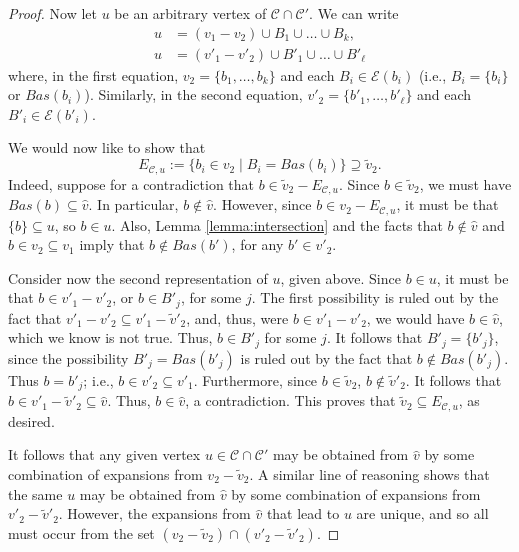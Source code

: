 \documentclass{amsart}
\newtheorem{standing assumption}[theorem]{Standing Assumption}
\begin{document}
\begin{proof}
Now let $u$ be an arbitrary vertex of $\mathcal{C} \cap \mathcal{C}'$. We 
can write
\begin{align*}
u &= (v_{1} - v_{2}) \cup B_{1} \cup \ldots \cup B_{k}, \\
u &= (v'_{1} - v'_{2}) \cup B'_{1} \cup \ldots \cup B'_{\ell}
\end{align*}
where, in the first equation,
 $v_{2} = \{ b_{1}, \ldots, b_{k} \}$ and 
each $B_{i} \in \mathcal{E}(b_{i})$ (i.e., $B_{i} = \{ b_{i} \}$
or $Bas(b_{i})$).
Similarly, in the second equation, 
$v'_{2} = \{ b'_{1}, \ldots, b'_{\ell} \}$ and 
each $B'_{i} \in \mathcal{E}(b'_{i})$.

We would now like to show that 
\[ E_{\mathcal{C},u} := \{ b_{i} \in v_{2} \mid B_{i} = Bas(b_{i}) \} \supseteq \tilde{v}_{2}. \]
Indeed, suppose for a contradiction that $b \in \tilde{v}_{2} - E_{\mathcal{C},u}$. Since $b \in \tilde{v}_{2}$, we must have $Bas(b) \subseteq \hat{v}$. In particular, $b \not \in \hat{v}$. However, since $b \in v_{2} - E_{\mathcal{C},u}$,
it must be that $\{ b \} \subseteq u$, so $b \in u$. Also, Lemma \ref{lemma:intersection} and the facts that $b \not \in \hat{v}$ and $b \in v_{2} \subseteq v_{1}$ imply that $b \not \in Bas(b')$, for any $b' \in v'_{2}$. 

Consider now the second representation of $u$, given above. Since $b \in u$, it must be that $b \in v'_{1} - v'_{2}$, or 
$b \in B'_{j}$, for some $j$. The first possibility is ruled out by the fact that $v'_{1} - v'_{2} \subseteq v'_{1} - \tilde{v}'_{2}$, and, thus, were $b \in v'_{1} - v'_{2}$, we would have $b \in \hat{v}$, which we know is not true. Thus, $b \in B'_{j}$ for some $j$. It follows that $B'_{j} = \{ b'_{j} \}$, since the possibility $B'_{j} = Bas(b'_{j})$ is ruled out by the fact that $b \not \in Bas(b'_{j})$. Thus $b = b'_{j}$; i.e., $b \in v'_{2} \subseteq v'_{1}$. Furthermore, since $b \in \tilde{v}_{2}$, 
$b \not \in \tilde{v}'_{2}$. It follows that $b \in v'_{1} - \tilde{v}'_{2} \subseteq \hat{v}$. Thus, $b \in \hat{v}$, a contradiction. This proves that $\tilde{v}_{2} \subseteq E_{\mathcal{C},u}$, as desired.  

It follows that any given vertex $u \in \mathcal{C} \cap \mathcal{C}'$ may be obtained from $\hat{v}$ by some combination of expansions from $v_{2} - \tilde{v}_{2}$. 
A similar line of reasoning shows that the same $u$ may be obtained from 
$\hat{v}$ by some combination of expansions  from $v'_{2} - \tilde{v}'_{2}$. However, the expansions from $\hat{v}$ that lead to $u$ are unique, and so all must occur from the
set $(v_{2}-\tilde{v}_{2}) \cap (v'_{2} - \tilde{v}'_{2})$. 
\end{proof}
\end{document}
